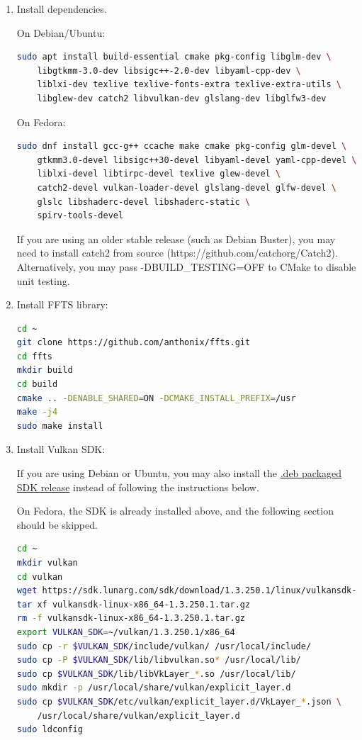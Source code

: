 \begin{enumerate}

\item Install dependencies.

On Debian/Ubuntu:

\begin{lstlisting}[language=sh, numbers=none]
sudo apt install build-essential cmake pkg-config libglm-dev \
	libgtkmm-3.0-dev libsigc++-2.0-dev libyaml-cpp-dev \
	liblxi-dev texlive texlive-fonts-extra texlive-extra-utils \
	libglew-dev catch2 libvulkan-dev glslang-dev libglfw3-dev
\end{lstlisting}

On Fedora:

\begin{lstlisting}[language=sh, numbers=none]
sudo dnf install gcc-g++ ccache make cmake pkg-config glm-devel \
	gtkmm3.0-devel libsigc++30-devel libyaml-devel yaml-cpp-devel \
	liblxi-devel libtirpc-devel texlive glew-devel \
	catch2-devel vulkan-loader-devel glslang-devel glfw-devel \
	glslc libshaderc-devel libshaderc-static \
	spirv-tools-devel
\end{lstlisting}

If you are using an older stable release (such as Debian Buster), you may need to install catch2 from source
(https://github.com/catchorg/Catch2). Alternatively, you may pass -DBUILD\_TESTING=OFF to CMake to disable unit testing.

\item Install FFTS library:

\begin{lstlisting}[language=sh, numbers=none]
cd ~
git clone https://github.com/anthonix/ffts.git
cd ffts
mkdir build
cd build
cmake .. -DENABLE_SHARED=ON -DCMAKE_INSTALL_PREFIX=/usr
make -j4
sudo make install
\end{lstlisting}

\item Install Vulkan SDK:

If you are using Debian or Ubuntu, you may also install the
\href{https://vulkan.lunarg.com/doc/sdk/1.3.261.1/linux/getting_started_ubuntu.html}{.deb packaged SDK release} instead
of following the instructions below.

On Fedora, the SDK is already installed above, and the following section should be skipped.

\begin{lstlisting}[language=sh, numbers=none]
cd ~
mkdir vulkan
cd vulkan
wget https://sdk.lunarg.com/sdk/download/1.3.250.1/linux/vulkansdk-linux-x86_64-1.3.250.1.tar.gz
tar xf vulkansdk-linux-x86_64-1.3.250.1.tar.gz
rm -f vulkansdk-linux-x86_64-1.3.250.1.tar.gz
export VULKAN_SDK=~/vulkan/1.3.250.1/x86_64
sudo cp -r $VULKAN_SDK/include/vulkan/ /usr/local/include/
sudo cp -P $VULKAN_SDK/lib/libvulkan.so* /usr/local/lib/
sudo cp $VULKAN_SDK/lib/libVkLayer_*.so /usr/local/lib/
sudo mkdir -p /usr/local/share/vulkan/explicit_layer.d
sudo cp $VULKAN_SDK/etc/vulkan/explicit_layer.d/VkLayer_*.json \
	/usr/local/share/vulkan/explicit_layer.d
sudo ldconfig
\end{lstlisting}


\end{enumerate}
